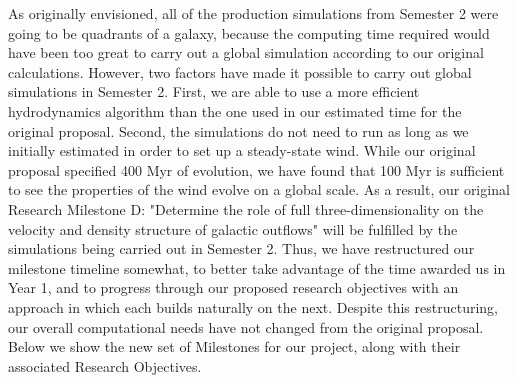 \documentclass[11pt,letterpaper,english]{article}
\begin{document}
As originally envisioned, all of the production simulations from Semester 2 were going to be quadrants of a galaxy, because the computing time required would have been too great to carry out a global simulation according to our original calculations. However, two factors have made it possible to carry out global simulations in Semester 2. First, we are able to use a more efficient hydrodynamics algorithm than the one used in our estimated time for the original proposal. Second, the simulations do not need to run as long as we initially estimated in order to set up a steady-state wind. While our original proposal specified 400 Myr of evolution, we have found that 100 Myr is sufficient to see the properties of the wind evolve on a global scale.
As a result, our original Research Milestone D: "Determine the role of full three-dimensionality on the velocity and density structure of galactic outflows" will be fulfilled by the simulations being carried out in Semester 2. Thus, we have restructured our milestone timeline somewhat, to better take advantage of the time awarded us in Year 1, and to progress through our proposed research objectives with an approach in which each builds naturally on the next. Despite this restructuring, our overall computational needs have not changed from the original proposal. Below we show the new set of Milestones for our project, along with their associated Research Objectives.
~\\~\\
\end{document}
